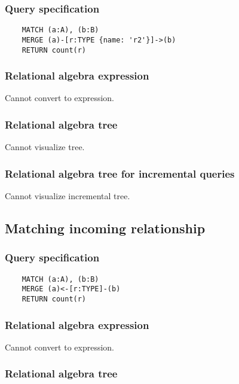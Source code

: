 	\subsubsection*{Query specification}

	\begin{lstlisting}
	MATCH (a:A), (b:B)
	MERGE (a)-[r:TYPE {name: 'r2'}]->(b)
	RETURN count(r)
	\end{lstlisting}


	\subsubsection*{Relational algebra expression}

	Cannot convert to expression.

	\subsubsection*{Relational algebra tree}

	Cannot visualize tree.

	\subsubsection*{Relational algebra tree for incremental queries}

	Cannot visualize incremental tree.
	\subsection{Matching incoming relationship}

	\subsubsection*{Query specification}

	\begin{lstlisting}
	MATCH (a:A), (b:B)
	MERGE (a)<-[r:TYPE]-(b)
	RETURN count(r)
	\end{lstlisting}


	\subsubsection*{Relational algebra expression}

	Cannot convert to expression.

	\subsubsection*{Relational algebra tree}

